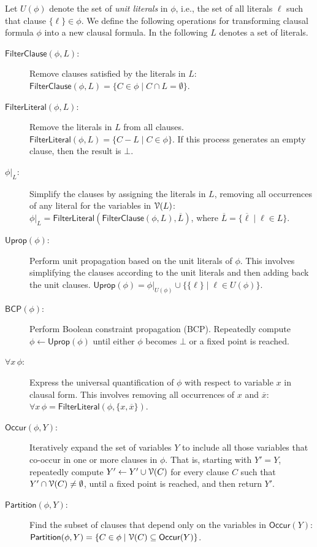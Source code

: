 \documentclass[letterpaper,USenglish,cleveref, autoref, thm-restate]{lipics-v2021}
\newcommand{\nil}{\bot}
\newcommand{\obar}[1]{\overline{#1}}
\newcommand{\lit}{\ell}
\newcommand{\dependencyset}{{\cal V}}
\newcommand{\simplify}[2]{#1|_{#2}}
\newcommand{\ureduce}[2]{\forall #2\, #1}
\newcommand{\algo}[1]{\textsf{#1}}
\newcommand{\cfilter}{\algo{FilterClause}}
\newcommand{\lfilter}{\algo{FilterLiteral}}
\newcommand{\bcp}{\algo{BCP}}
\newcommand{\uprop}{\algo{Uprop}}
\newcommand{\partition}{\algo{Partition}}
\newcommand{\occur}{\algo{Occur}}
\begin{document}
Let $U(\phi)$ denote the set of \emph{unit literals} in $\phi$, i.e., the set of all literals $\lit$ such that clause $\{ \lit \} \in \phi$.  
We define the following operations for transforming clausal formula $\phi$ into a new clausal formula.  In the following $L$ denotes a set of literals.
\begin{description}
\item[$\cfilter(\phi, L)$:] Remove clauses satisfied by the literals in $L$: $\cfilter(\phi, L) = \{ C \in \phi \mid C \cap L = \emptyset\}$.

\item[$\lfilter(\phi, L)$:] Remove the literals in $L$ from all clauses.  
   $\lfilter(\phi, L) = \{ C - L \mid  C \in \phi \}$.  If this process generates an empty clause, then the result is $\nil$.

\item[$\simplify{\phi}{L}$:] Simplify the clauses by assigning the literals in $L$, removing all occurrences of any literal for the variables in $\dependencyset(L)$:
$\simplify{\phi}{L} = \lfilter(\cfilter(\phi, L), \obar{L})$, where $\obar{L} = \{ \obar{\lit} \mid \lit \in L \}$.

\item[$\uprop(\phi)$:]  Perform unit propagation based on the unit literals of $\phi$.  This involves simplifying the clauses according to the unit literals and then adding back the unit clauses.
$\uprop(\phi) = \simplify{\phi}{U(\phi)} \cup \{ \{\lit \} \mid  \lit \in U(\phi) \}$.

\item[$\bcp(\phi)$:] Perform Boolean constraint propagation (BCP).
  Repeatedly compute $\phi \leftarrow \uprop(\phi)$ until either $\phi$ becomes $\nil$ or a fixed point is reached.

\item[$\ureduce{\phi}{x}$:] Express the universal quantification of $\phi$ with respect to variable $x$ in clausal form.  This involves removing all occurrences of $x$ and $\obar{x}$:
$\ureduce{\phi}{x} = \lfilter(\phi, \{x, \obar{x}\})$.

\item[$\occur(\phi, Y)$:] Iteratively expand the set of variables $Y$ to include all those variables that co-occur in one or more clauses in $\phi$.
  That is, starting with $Y' = Y$,
  repeatedly compute $Y' \leftarrow Y' \cup \dependencyset(C)$
  for every clause $C$ such that $Y' \cap \dependencyset(C) \not = \emptyset$,
  until a fixed point is reached, and then return $Y'$.

\item[$\partition(\phi, Y)$:] Find the subset of clauses that depend only on the variables in $\occur(Y)$:
$\partition(\phi, Y) = \{ C \in \phi \mid \dependencyset(C) \subseteq \occur(Y)\}$.

\end{description}
\end{document}
